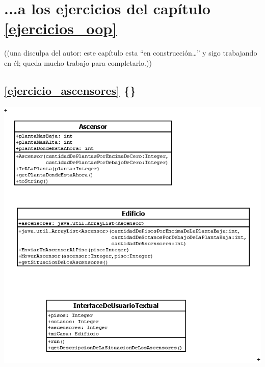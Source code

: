 \documentclass[spanish,12pt,a4paper,final,oneside]{book}
\begin{document}
 
\section{...a los ejercicios del capítulo \ref{ejercicios_oop}}

\begin{footnotesize}((una disculpa del autor: este capítulo esta ``en construcción\ldots'' y sigo trabajando en él; queda mucho trabajo para completarlo.))\end{footnotesize}

\vspace{1cm}
\subsection*{\ref{ejercicio_ascensores} \{\}}
\includegraphics[width=\textwidth]{ascensores - diagrama de clases} 
\vspace{0.5cm}
\end{document}
